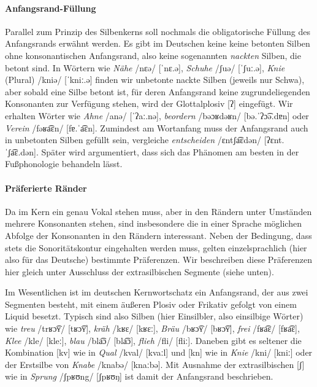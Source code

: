\paragraph*{Anfangsrand-Füllung}

Parallel zum Prinzip des Silbenkerns soll nochmals die obligatorische Füllung des Anfangsrands erwähnt werden.
Es gibt im Deutschen keine keine betonten Silben ohne konsonantischen Anfangsrand, also keine sogenannten \textit{nackten} Silben, die betont sind.
In Wörtern wie \textit{Nähe} /nɛə/ [ˈnɛ.ə], \textit{Schuhe} /ʃuə/ [ˈʃuː.ə], \textit{Knie} (Plural) /kniə/ [ˈkniː.ə] finden wir unbetonte nackte Silben (jeweils nur Schwa), aber sobald eine Silbe betont ist, für deren Anfangsrand keine zugrundeliegenden Konsonanten zur Verfügung stehen, wird der Glottalplosiv [ʔ] eingefügt.
Wir erhalten Wörter wie \textit{Ahne} /anə/ [ˈʔaː.nə], \textit{beordern} /bəɔʁdəʁn/ [bə.ˈʔɔ͡ə.dɐn] oder \textit{Verein} /fəʁa͡ɛn/ [fɐ.ˈa͡ɛn].
Zumindest am Wortanfang muss der Anfangsrand auch in unbetonten Silben gefüllt sein, vergleiche \textit{entscheiden} /ɛntʃa͡ɛdən/ [ʔɛnt.ˈʃa͡ɛ.dən].
Später wird argumentiert, dass sich das Phänomen am besten in der Fußphonologie behandeln lässt.

\paragraph*{Präferierte Ränder}

Da im Kern ein genau Vokal stehen muss, aber in den Rändern unter Umständen mehrere Konsonanten stehen, sind insbesondere die in einer Sprache möglichen Abfolge der Konsonanten in den Rändern interessant.
Neben der Bedingung, dass stets die Sonoritätskontur eingehalten werden muss, gelten einzelsprachlich (hier also für das Deutsche) bestimmte Präferenzen.
Wir beschreiben diese Präferenzen hier gleich unter Ausschluss der extrasilbischen Segmente (siehe unten).

Im Wesentlichen ist im deutschen Kernwortschatz ein Anfangsrand, der aus zwei Segmenten besteht, mit einem äußeren Plosiv oder Frikativ gefolgt von einem Liquid besetzt.
Typisch sind also Silben (hier Einsilbler, also einsilbige Wörter) wie \textit{treu} /trʁɔ͡ʏ/ [tʁɔ͡ʏ], \textit{kräh} /kʁɛ/ [kʁɛː], \textit{Bräu} /bʁɔ͡ʏ/ [bʁɔ͡ʏ], \textit{frei} /fʁa͡ɛ/ [fʁa͡ɛ], \textit{Klee} /kle/ [kleː], \textit{blau} /bla͡ɔ/ [bla͡ɔ], \textit{flieh} /fli/ [fliː].
Daneben gibt es seltener die Kombination [kv] wie in \textit{Qual} /kval/ [kvaːl] und [kn] wie in \textit{Knie} /kni/ [kniː] oder der Erstsilbe von \textit{Knabe} /knabə/ [knaːbə].
Mit Ausnahme der extrasilbischen [ʃ] wie in \textit{Sprung} /ʃpʁʊng/ [ʃpʁʊŋ] ist damit der Anfangsrand beschrieben.

